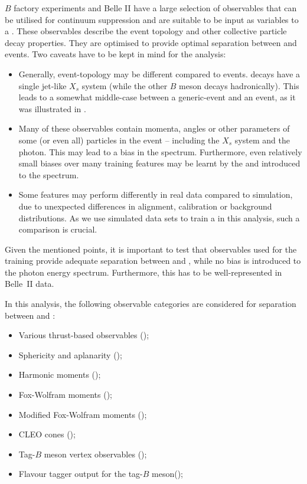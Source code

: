 $B$ factory experiments and Belle II have a large selection of observables that can be utilised for continuum suppression and are suitable to be input as variables to a \BDT.
These observables describe the event topology and other collective particle decay properties. 
They are optimised to provide optimal separation between \BB and \qqbar events.
Two caveats have to be kept in mind for the \BtoXsgamma analysis:
\begin{itemize}
    \item Generally, \BtoXsgamma event-topology may be different compared to \BB events. 
    \BtoXsgamma decays have a single jet-like $X_s$ system (while the other $B$ meson decays hadronically).
    This leads to a somewhat middle-case between a generic-\BB event and an \epem\ra\qqbar event, as it was illustrated in .
    \item Many of these observables contain momenta, angles or other parameters of some (or even all) particles in the event -- including the $X_s$ system and the photon.
    This may lead to a bias in the \EB spectrum.
    Furthermore, even relatively small biases over many training features may be learnt by the \BDT and introduced to the spectrum.
    \item Some features may perform differently in real data compared to simulation, due to unexpected differences in alignment, calibration or background distributions.
    As we use simulated data sets to train a \BDT in this analysis, such a comparison is crucial.
\end{itemize}
Given the mentioned points, it is important to test that observables used for the training provide adequate separation between \BtoXsgamma and \qqbar, while no bias is introduced to the photon energy spectrum.
Furthermore, this has to be well-represented in Belle~II data.

In this analysis, the following observable categories are considered for separation between \epem\ra\qqbar and \BtoXsgamma:
\begin{itemize}
    \item Various thrust-based observables ();
    \item Sphericity and aplanarity ();
    \item Harmonic moments ();
    \item Fox-Wolfram moments ();
    \item Modified Fox-Wolfram moments ();
    \item CLEO cones ();
    \item Tag-$B$ meson vertex observables ();
    \item Flavour tagger output for the tag-$B$ meson();
\end{itemize}

